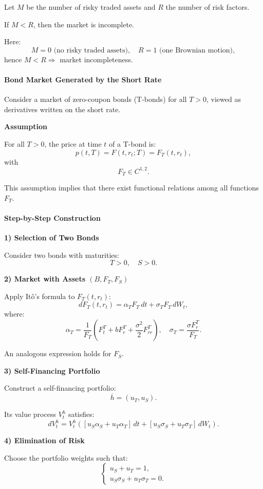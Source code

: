 \documentclass[12pt,a4paper]{article}
\theoremstyle{definition}
\begin{document}
Let $M$ be the number of risky traded assets and $R$ the number of risk factors.

If $M < R$, then the market is incomplete.

Here:
\[
M = 0 \text{ (no risky traded assets)}, \quad R = 1 \text{ (one Brownian motion)},
\]
hence $M < R \Rightarrow$ market incompleteness.

\paragraph{Bond Market Generated by the Short Rate}

Consider a market of zero-coupon bonds (T-bonds) for all $T > 0$, viewed as derivatives written on the short rate.

\textbf{Assumption}

For all $T > 0$, the price at time $t$ of a T-bond is:
\[
p(t, T) = F(t, r_t; T) = F_T(t, r_t),
\]
with
\[
F_T \in C^{1,2}.
\]

This assumption implies that there exist functional relations among all functions $F_T$.

\paragraph{Step-by-Step Construction}

\textbf{1) Selection of Two Bonds}

Consider two bonds with maturities:
\[
T > 0, \quad S > 0.
\]

\textbf{2) Market with Assets $(B, F_T, F_S)$}

Apply Itô's formula to $F_T(t, r_t)$:
\[
dF_T(t, r_t) = \alpha_T F_T \, dt + \sigma_T F_T \, dW_t,
\]
where:
\[
\alpha_T = \frac{1}{F_T}\left(F_t^T + bF_r^T + \frac{\sigma^2}{2}F_{rr}^T\right), \quad \sigma_T = \frac{\sigma F_r^T}{F_T}.
\]

An analogous expression holds for $F_S$.

\textbf{3) Self-Financing Portfolio}

Construct a self-financing portfolio:
\[
\overline{h} = (u_T, u_S).
\]

Its value process $V_t^h$ satisfies:
\[
dV_t^h = V_t^h([u_S \alpha_S + u_T \alpha_T] \, dt + [u_S \sigma_S + u_T \sigma_T] \, dW_t).
\]

\textbf{4) Elimination of Risk}

Choose the portfolio weights such that:
\[
\begin{cases}
u_S + u_T = 1, \\
u_S \sigma_S + u_T \sigma_T = 0.
\end{cases}
\]
\end{document}
